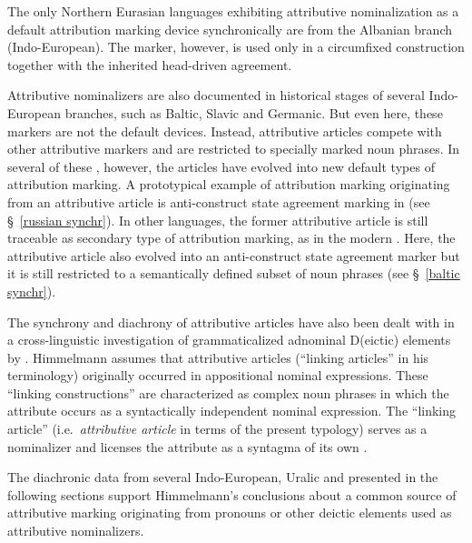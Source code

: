The only Northern Eurasian languages exhibiting attributive nominalization as a default attribution marking device synchronically are from the Albanian branch (Indo-European). The marker, however, is used only in a circumfixed construction together with the inherited head\hyp{}driven agreement.

Attributive nominalizers are also documented in historical stages of several Indo-European branches, such as Baltic, Slavic and Germanic. But even here, these markers are not the default devices. Instead, attributive articles compete with other attributive markers and are restricted to specially marked noun phrases. In several of these , however, the articles have evolved into new default types of attribution marking. A prototypical example of attribution marking originating from an attributive article is anti-construct state agreement marking in  (see \S~\ref{russian synchr}). In other languages, the former attributive article is still traceable as secondary type of attribution marking, as in the modern . Here, the attributive article also evolved into an anti-construct state agreement marker but it is still restricted to a semantically defined subset of noun phrases (see \S~\ref{baltic synchr}). 

The synchrony and diachrony of attributive articles have also been dealt with in a cross-linguistic investigation of grammaticalized adnominal D(eictic) elements by \cite{himmelmann1997}. Himmelmann assumes that attributive articles (“linking articles” in his terminology) originally occurred in appositional nominal expressions. These “linking constructions” are characterized as complex noun phrases in which the attribute occurs as a syntactically independent nominal expression. The “linking article” (i.e.~\textit{attributive article} in terms of the present typology) serves as a nominalizer and licenses the attribute as a syntagma of its own \cite[188]{himmelmann1997}.

The diachronic data from several Indo-European, Uralic and  presented in the following sections support Himmelmann's conclusions about a common source of attributive marking originating from pronouns or other deictic elements used as attributive nominalizers.

